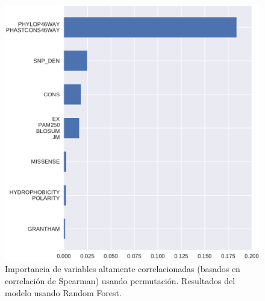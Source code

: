 \begin{figure}[H]
    \centering
    \includegraphics[scale=0.6]{documents/latex/figures/3/integral/integral_importance_cluster.pdf}
    \caption{Importancia de variables altamente correlacionadas (basados en correlación de Spearman) usando permutación. Resultados del modelo usando Random Forest.}
    \label{fig:importance_cluster_integral_rf}
\end{figure}



